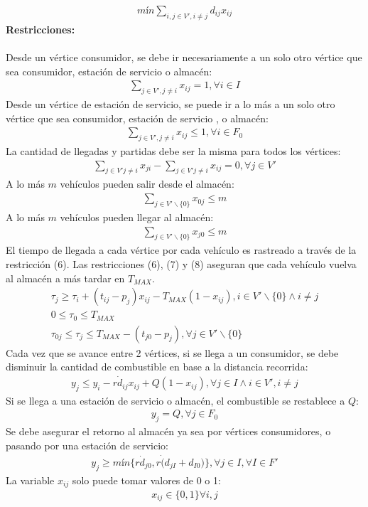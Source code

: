 \documentclass[letter, 10pt]{article}
\begin{document}
\begin{align*}
mín \sum_{i,j \in V', i \neq j} d_{ij}x_{ij}    
\end{align*}
\textbf{Restricciones:}\\
\\
Desde un vértice consumidor, se debe ir necesariamente a un solo otro vértice que sea consumidor, estación de servicio o almacén:
\begin{align}
     \sum_{j \in V', j \neq i} x_{ij} = 1, \forall i \in I 
\end{align}
Desde un vértice de estación de servicio, se puede ir a lo más a un solo otro vértice que sea consumidor, estación de servicio , o almacén:
\begin{align}
     \sum_{j \in V', j \neq i} x_{ij} \leq 1, \forall i \in F_0 
\end{align}
La cantidad de llegadas y partidas debe ser la misma para todos los vértices:
\begin{align}
    \sum_{j \in V' j \neq i} x_{ji} - \sum_{j \in V' j \neq i} x_{ij} = 0, \forall j \in V'
\end{align}
A lo más $m$ vehículos pueden salir desde el almacén:
\begin{align}
    \sum_{j \in V' \backslash \{0\}} x_{0j} \leq m
\end{align}
A lo más $m$ vehículos pueden llegar al almacén:
\begin{align}
    \sum_{j \in V' \backslash \{0\}} x_{j0} \leq m
\end{align}
El tiempo de llegada a cada vértice por cada vehículo es rastreado a través de la restricción (6). Las restricciones (6), (7) y (8) aseguran que cada vehículo vuelva al almacén a más tardar en $T_{MAX}$.
\begin{align}
    \tau_j \geq \tau_i + (t_{ij} - p_j )x_{ij} - T_{MAX}(1 - x_{ij}), i \in V' \backslash \{0\} \land i \neq j
    \\ 0 \leq \tau_0 \leq T_{MAX}
    \\ \tau_{0j} \leq \tau_j \leq T_{MAX} - (t_{j0} - p_j), \forall j \in V' \backslash \{0\}
\end{align}
Cada vez que se avance entre 2 vértices, si se llega a un consumidor, se debe disminuir la cantidad de combustible en base a la distancia recorrida:
\begin{align}
    y_j \leq y_i - r \dot d_{ij}x_{ij} + Q(1-x_{ij}), \forall j \in I \land i \in V', i \neq j
\end{align}
Si se llega a una estación de servicio o almacén, el combustible se restablece a $Q$:
\begin{align}
    y_j = Q, \forall j \in F_0
\end{align}
Se debe asegurar el retorno al almacén ya sea por vértices consumidores, o pasando por una estación de servicio:
\begin{align}
    y_j \geq mín\{ r \dot d_{j0}, r \dot (d_{jI} + d_{I0})\}, \forall j \in I, \forall I \in F'
\end{align}
La variable $x_{ij}$ solo puede tomar valores de 0 o 1:
\begin{align}
    x_{ij} \in \{ 0, 1\} \forall i,j
\end{align}
\end{document}
